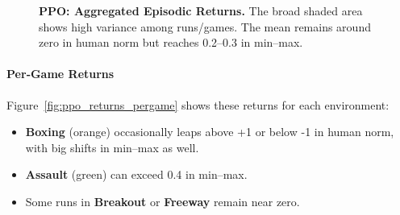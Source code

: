 \begin{figure}[htbp]
	\centering
	\quad
	\caption{\textbf{PPO: Aggregated Episodic Returns.} 
		The broad shaded area shows high variance among runs/games. 
		The mean remains around zero in human norm but reaches 0.2--0.3 in min--max.}
	\label{fig:ppo_returns_agg}
\end{figure}

\paragraph{Per‐Game Returns}
Figure~\ref{fig:ppo_returns_pergame} shows these returns for each environment:
\begin{itemize}
	\item \textbf{Boxing} (orange) occasionally leaps above +1 or below -1 in human norm,
	with big shifts in min--max as well.
	\item \textbf{Assault} (green) can exceed 0.4 in min--max.
	\item Some runs in \textbf{Breakout} or \textbf{Freeway} remain near zero.
\end{itemize}

